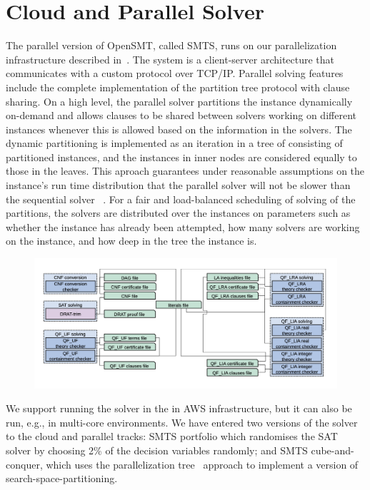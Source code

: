 \documentclass{easychair}
\begin{document}
\section{Cloud and Parallel Solver}
The parallel version of OpenSMT, called SMTS, runs on our parallelization infrastructure described in~\cite{MarescottiHS18}. The system is a client-server architecture that communicates with a custom protocol over TCP/IP. Parallel solving features include the complete implementation of the partition tree protocol with clause sharing. On a high level, the parallel solver partitions the instance dynamically on-demand and allows clauses to be shared between solvers working on different instances whenever this is allowed based on the information in the solvers. The dynamic partitioning is implemented as an iteration in a tree of consisting of partitioned instances, and the instances in inner nodes are considered equally to those in the leaves. This aproach guarantees under reasonable assumptions on the instance’s run time distribution that the parallel solver will not be slower than the sequential solver ~\cite{HyvarinenMS:SAT15}. For a fair and load-balanced scheduling of solving of the partitions, the solvers are distributed over the instances on parameters such as whether the instance has already been attempted, how many solvers are working on the instance, and how deep in the tree the instance is.
\begin{figure}
    \centering
    \includegraphics[angle=0, width=12cm]{Architecture.png}
    \label{fig:architecture}
\end{figure}
We support running the solver in the in AWS infrastructure, but it can also be run, e.g., in multi-core environments. We have entered two versions of the solver to the cloud and parallel tracks: SMTS portfolio which randomises the SAT solver by choosing 2\% of the decision variables randomly; and SMTS cube-and-conquer, which uses the parallelization tree~\cite{HyvarinenMS:SAT15} approach to implement a version of search-space-partitioning.
\end{document}
